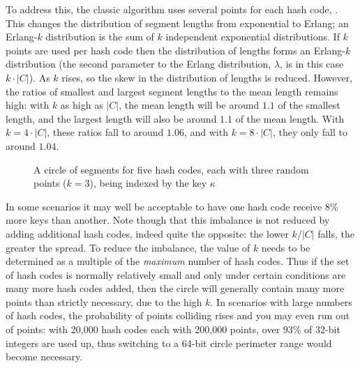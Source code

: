 \documentclass[runningheads,a4paper]{llncs}
\newcommand{\slice}[3]{

  \draw (0,0) -- (#1:1) arc (#1:#2:1);
  \draw (0,0) -- (#1:1.1);

  \node at (#1:1.3) {#3};
}
\begin{document}
To address this, the classic algorithm uses several points for each
hash code, . This changes the
distribution of segment lengths from exponential to Erlang; an
Erlang-$k$ distribution is the sum of $k$ independent exponential
distributions. If $k$ points are used per hash code then the
distribution of lengths forms an Erlang-$k$ distribution (the second
parameter to the Erlang distribution, $\lambda$, is in this case $k
\cdot |C|$). As $k$ rises, so the skew in the distribution of lengths
is reduced. However, the ratios of smallest and largest segment
lengths to the mean length remains high: with $k$ as high as $|C|$,
the mean length will be around $1.1$ of the smallest length, and the
largest length will also be around $1.1$ of the mean length. With $k =
4 \cdot |C|$, these ratios fall to around $1.06$, and with $k = 8
\cdot |C|$, they only fall to around $1.04$.

\begin{figure}
\begin{center}
\end{center}
\caption{A circle of segments for five hash codes, each with three
  random points ($k = 3$), being indexed by the key $\kappa$}
\label{fig:circle-multi-point}
\end{figure}

In some scenarios it may well be acceptable to have one hash code
receive $8\%$ more keys than another. Note though that this imbalance
is not reduced by adding additional hash codes, indeed quite the
opposite: the lower $k / |C|$ falls, the greater the spread. To reduce
the imbalance, the value of $k$ needs to be determined as a multiple
of the {\em maximum} number of hash codes. Thus if the set of hash
codes is normally relatively small and only under certain conditions
are many more hash codes added, then the circle will generally contain
many more points than strictly necessary, due to the high $k$. In
scenarios with large numbers of hash codes, the probability of points
colliding rises and you may even run out of points: with 20,000 hash
codes each with 200,000 points, over $93\%$ of 32-bit integers are
used up, thus switching to a 64-bit circle perimeter range would
become necessary.
\end{document}
